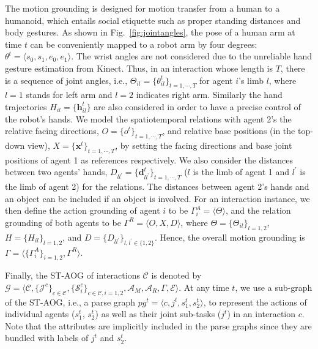 \documentclass[letterpaper, 10 pt, conference]{ieeeconf}  %
\def \hb{\bm{h}} %
\def \xb{\bm{x}} %
\def \db{\bm{d}} %
\begin{document}
   The motion grounding is designed for motion transfer from a human to a humanoid, which entails social etiquette such as proper standing distances and body gestures. As shown in Fig.~\ref{fig:jointangles}, the pose of a human arm at time $t$ can be conveniently mapped to a robot arm by four degrees: $\theta^t = \langle s_0, s_1, e_0, e_1 \rangle$. The wrist angles are not considered due to the unreliable hand gesture estimation from Kinect. Thus, in an interaction whose length is $T$, there is a sequence of joint angles, i.e., $\Theta_{il} = \{\theta_{il}^t\}_{t = 1,\cdots,T}$ for agent $i$'s limb $l$, where $l = 1$ stands for left arm and $l = 2$ indicates right arm. Similarly the hand trajectories $H_{il} = \{\hb_{il}^t\}$ are also considered in order to have a precise control of the robot's hands. We model the spatiotemporal relations with agent 2's the relative facing directions, $O = \{o^t\}_{t = 1,\cdots,T}$, and relative base positions (in the top-down view), $X = \{\xb^t\}_{t = 1,\cdots,T}$, by setting the facing directions and base joint positions of agent 1 as references respectively. We also consider the distances between two agents' hands, $D_{ll^\prime} = \{\db_{ll^\prime}^t\}_{t = 1,\cdots,T}$ ($l$ is the limb of agent 1 and $l^\prime$ is the limb of agent 2) for the relations. The distances between agent 2's hands and an object can be included if an object is involved. For an interaction instance, we then define the action grounding of agent $i$ to be $\Gamma^A_i = \langle \Theta \rangle$, and the relation grounding of both agents to be $\Gamma^R = \langle O, X, D \rangle$, where $ \Theta = \{\Theta_{il}\}_{l=1,2}$, $H = \{H_{il}\}_{l=1,2}$, and $D = \{D_{ll^\prime}\}_{l,l^\prime \in \{1,2\}}$. Hence, the overall motion grounding is $\Gamma = \langle \{\Gamma^A_i\}_{i=1,2}, \Gamma^R \rangle$.
   
    Finally, the ST-AOG of interactions $\mathcal{C}$ is denoted by $\mathcal{G} = \langle \mathcal{C}, \{\mathcal{J}^c\}_{c \in \mathcal{C}}, \{\mathcal{S}_i^c\}_{c \in \mathcal{C}, i=1,2}, \mathcal{A}_M, \mathcal{A}_R, \Gamma,  \mathcal{E} \rangle$. At any time $t$, we use a sub-graph of the ST-AOG, i.e., a parse graph $pg^{t} = \langle c, j^t, s_1^t, s_2^t  \rangle$, to represent the actions of individual agents ($s_1^t$, $s_2^t$) as well as their joint sub-tasks ($j^t$) in an interaction $c$. Note that the attributes are implicitly included in the parse graphs since they are bundled with labels of $j^t$ and $s_2^t$. 
    
\end{document}
